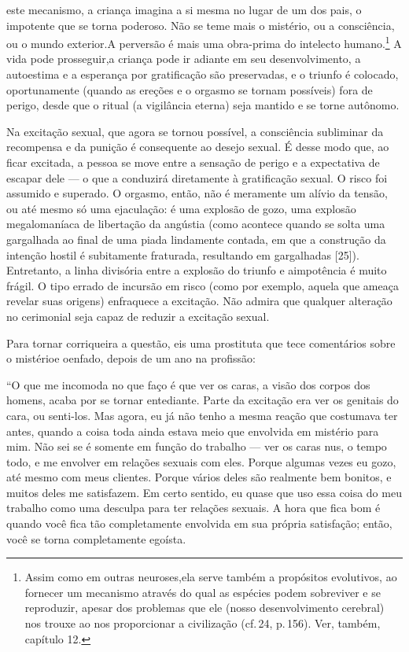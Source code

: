 este mecanismo, a criança imagina a si mesma no lugar de um dos pais, o
impotente que se torna poderoso. Não se teme mais o mistério, ou a
consciência, ou o mundo exterior.\idxfantareve[|)] A perversão é mais uma obra-prima do
intelecto humano.\footnote{ Assim como em outras neuroses,\idxneuro[|nn] ela serve
também a propósitos evolutivos, ao fornecer um mecanismo através do qual
as espécies podem sobreviver e se reproduzir, apesar dos problemas que ele
(nosso desenvolvimento cerebral) nos trouxe ao nos proporcionar a civilização
(cf.\,24, p.\,156). Ver, também, capítulo 12.}
A vida pode prosseguir,\idxtrauma[|(] a criança pode ir adiante em seu desenvolvimento,
a autoestima e a esperança por gratificação são preservadas, e o triunfo
é colocado, oportunamente (quando as ereções e o orgasmo se tornam possíveis)
fora de perigo, desde que o ritual (a vigilância eterna) seja mantido
e se torne autônomo.

Na excitação sexual, que agora se tornou possível, a consciência
subliminar da recompensa e da punição é consequente ao desejo sexual.
É desse modo que, ao ficar excitada, a pessoa se move entre a sensação\idxperigo{}
de perigo\idxpervexpos{} e a expectativa de escapar dele --- o que a conduzirá
diretamente à gratificação sexual. O risco foi assumido e superado. O\idxpervorgas{}
orgasmo,\idxorgas{} então, não é meramente um alívio da tensão, ou até mesmo só
uma ejaculação: é uma explosão de gozo, uma explosão megalomaníaca de
libertação da angústia (como acontece quando se solta uma gargalhada ao
final de uma piada lindamente contada, em que a construção da intenção
hostil é subitamente fraturada, resultando em gargalhadas [25]).
Entretanto, a linha divisória entre a explosão do triunfo e a\idxtrauma[|)]
impotência é muito frágil. O tipo errado de incursão em risco (como por
exemplo, aquela que ameaça revelar suas origens) enfraquece a
excitação. Não admira que qualquer alteração no cerimonial seja capaz
de reduzir a excitação sexual.

Para tornar corriqueira a questão, eis uma prostituta que tece
comentários sobre o mistério\idxprostenf[|(] e o\idxpervenfad[|(] enfado,\idxenfa{} depois de um ano na profissão:

``O que me incomoda no que faço é que ver os caras, a
visão dos corpos dos homens, acaba por se tornar entediante. Parte da
excitação era ver os genitais do cara, ou senti-los. Mas agora, eu já
não tenho a mesma reação que costumava ter antes, quando a coisa toda
ainda estava meio que envolvida em mistério para mim. Não sei se é
somente em função do trabalho --- ver os caras nus, o tempo todo, e me
envolver em relações sexuais com eles. Porque algumas vezes eu gozo,
até mesmo com meus clientes. Porque vários deles são realmente bem
bonitos, e muitos deles me satisfazem. Em certo sentido, eu quase que
uso essa coisa do meu trabalho como uma desculpa para ter relações
sexuais. A hora que fica bom é quando você fica tão completamente
envolvida em sua própria satisfação; então, você se torna completamente
egoísta.

